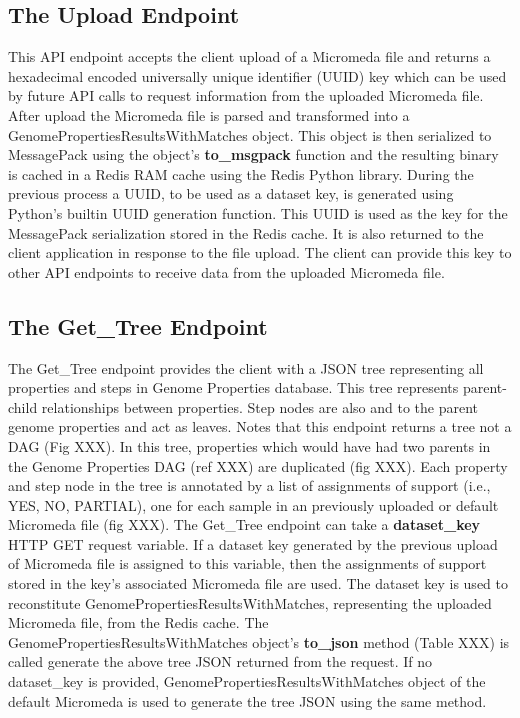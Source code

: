 \subsection{The Upload Endpoint} \label{endpoint-upload}

This API endpoint accepts the client upload of a Micromeda file and returns a hexadecimal encoded universally unique identifier (UUID) key which can be used by future API calls to request information from the uploaded Micromeda file. After upload the Micromeda file is parsed and transformed into a GenomePropertiesResultsWithMatches object. This object is then serialized to MessagePack using the object's \textbf{to\_msgpack} function and the resulting binary is cached in a Redis RAM cache using the Redis Python library. During the previous process a UUID, to be used as a dataset key, is generated using Python's builtin UUID generation function. This UUID is used as the key for the MessagePack serialization stored in the Redis cache. It is also returned to the client application in response to the file upload. The client can provide this key to other API endpoints to receive data from the uploaded Micromeda file. 

\subsection{The Get\_Tree Endpoint}

The Get\_Tree endpoint provides the client with a JSON tree representing all properties and steps in Genome Properties database. This tree represents parent-child relationships between properties. Step nodes are also and to the parent genome properties and act as leaves. Notes that this endpoint returns a tree not a DAG (Fig XXX). In this tree, properties which would have had two parents in the Genome Properties DAG (ref XXX) are duplicated (fig XXX). Each property and step node in the tree is annotated by a list of assignments of support (i.e., YES, NO, PARTIAL), one for each sample in an previously uploaded or default Micromeda file (fig XXX). The Get\_Tree endpoint can take a \textbf{dataset\_key} HTTP GET request variable. If a dataset key generated by the previous upload of Micromeda file is assigned to this variable, then the assignments of support stored in the key's associated Micromeda file are used. The dataset key is used to reconstitute GenomePropertiesResultsWithMatches, representing the uploaded Micromeda file, from the Redis cache. The GenomePropertiesResultsWithMatches object's \textbf{to\_json} method (Table XXX) is called generate the above tree JSON returned from the request. If no dataset\_key is provided, GenomePropertiesResultsWithMatches object of the default Micromeda is used to generate the tree JSON using the same method.

